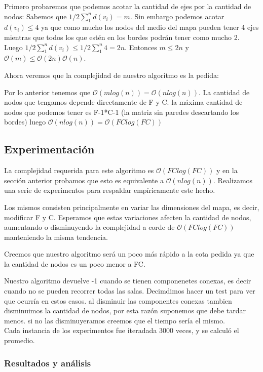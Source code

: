 \documentclass[spanish,12pt]{article}
\begin{document}
Primero probaremos que podemos acotar la cantidad de ejes por la cantidad de nodos:
Sabemos que $1/2  \sum_{1}^{n}d(v_{i}) =m $. Sin embargo podemos acotar $d(v_{i}) \leq 4$ ya que como mucho los nodos del medio del mapa pueden tener 4 ejes mientras que todos los que estén en los bordes podrán tener como mucho 2. Luego $1/2  \sum_{1}^{n}{d(v_{i})} \leq 1/2 \sum_{1}^{n}{4} = 2n$. Entonces $m \leq 2n$ y $\mathcal{O}(m) \leq \mathcal{O}(2n) \mathcal{O}(n)$.

Ahora veremos que la complejidad de nuestro algoritmo es la pedida:

Por lo anterior tenemos que $\mathcal{O}(mlog(n))= \mathcal{O}(nlog(n))$.
La cantidad de nodos que tengamos depende directamente de F y C. la máxima cantidad de nodos que podemos tener es F-1*C-1 (la matriz sin paredes descartando los bordes) luego $\mathcal{O}(nlog(n)) = \mathcal{O}(FClog(FC))$


\subsection{Experimentación}

La complejidad requerida para este algoritmo es $\mathcal{O}(FClog(FC))$ y en la sección anterior probamos que esto es equivalente a  $\mathcal{O}(nlog(n))$.
Realizamos una serie de experimentos para respaldar empíricamente este hecho.

Los mismos consisten principalmente en variar las dimensiones del mapa, es decir, modificar F y C. Esperamos que estas variaciones afecten la cantidad de nodos, aumentando o disminuyendo la complejidad a corde de $\mathcal{O}(FClog(FC))$ manteniendo la misma tendencia.

Creemos que nuestro algoritmo será un poco más rápido a la cota pedida ya que la cantidad de nodos es un poco menor a FC.

Nuestro algoritmo devuelve -1 cuando se tienen componenetes conexas, es decir cuando no se pueden recorrer todas las salas. Decimdimos hacer un test para ver que ocurría en estos casos. al disminuir las componentes conexas tambien disminuimos la cantidad de nodos, por esta razón suponemos que debe tardar menos. si no las disminuyeramos creemos que el tiempo sería el mismo.
\\
Cada instancia de los experimentos fue iteradada 3000 veces, y se calculó el promedio.
\subsubsection{Resultados y análisis}
\end{document}
